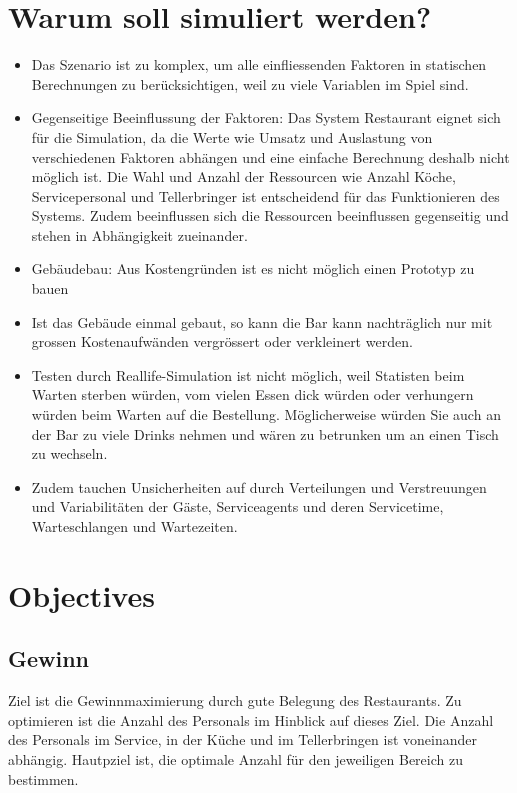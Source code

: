 \documentclass[ngerman,a4paper,12pt]{scrreprt}
\begin{document}
\section{Warum soll simuliert werden?}
	\begin{itemize}
		\item Das Szenario ist zu komplex, um alle einfliessenden Faktoren in statischen Berechnungen zu berücksichtigen, weil zu viele Variablen im Spiel sind.
		\item Gegenseitige Beeinflussung der Faktoren: Das System Restaurant eignet sich für die Simulation, da die Werte wie Umsatz und Auslastung von verschiedenen Faktoren abhängen und eine einfache Berechnung deshalb nicht möglich ist. Die Wahl und Anzahl der Ressourcen wie Anzahl Köche, Servicepersonal und Tellerbringer ist entscheidend für das Funktionieren des Systems. Zudem beeinflussen sich die Ressourcen beeinflussen gegenseitig und stehen in Abhängigkeit zueinander.
		\item Gebäudebau: Aus Kostengründen ist es nicht möglich einen Prototyp zu bauen
		\item Ist das Gebäude einmal gebaut, so kann die Bar kann nachträglich nur mit grossen Kostenaufwänden vergrössert oder verkleinert werden.
		\item Testen durch Reallife-Simulation ist nicht möglich, weil Statisten beim Warten sterben würden, vom vielen Essen dick würden oder verhungern würden beim Warten auf die Bestellung. Möglicherweise würden Sie auch an der Bar zu viele Drinks nehmen und wären zu betrunken um an einen Tisch zu wechseln.
		\item Zudem tauchen Unsicherheiten auf durch Verteilungen und Verstreuungen und Variabilitäten der Gäste, Serviceagents und deren Servicetime, Warteschlangen und Wartezeiten.
	\end{itemize}

\section{Objectives}
	\subsection{Gewinn}
	Ziel ist die Gewinnmaximierung durch gute Belegung des Restaurants. Zu optimieren ist die Anzahl des Personals im Hinblick auf dieses Ziel. Die Anzahl des Personals im Service, in der Küche und im Tellerbringen ist voneinander abhängig. Hautpziel ist, die optimale Anzahl für den jeweiligen Bereich zu bestimmen. 
\end{document}
